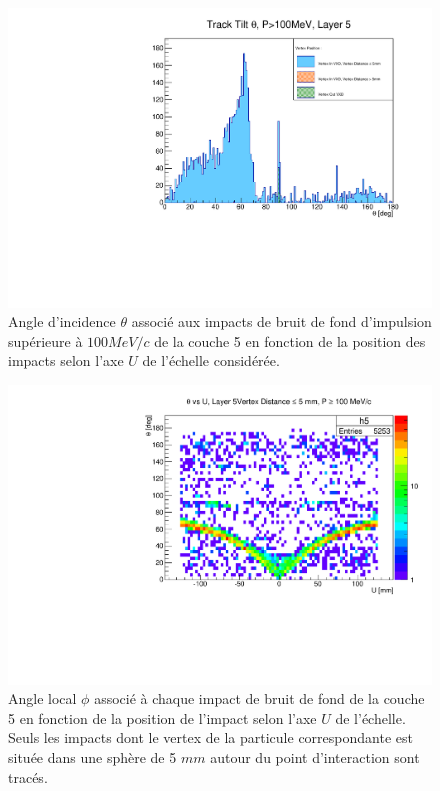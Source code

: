 \begin{appendices}
  \begin{figure}[!phtb]
    \centering
    \includegraphics[scale=0.58]{./figures/Track_Tilts_Beamstrahlung/beamstrahlung_Theta/Track_Tilts_Theta_P_sup_100MeV_Layer5.pdf}
    \caption{Angle d'incidence $\theta$ associ\'e aux impacts de bruit de fond d'impulsion sup\'erieure \`a $100 MeV/c$ de la couche 5 en fonction de la position des impacts selon l'axe $U$ de l'\'echelle consid\'er\'ee.}
    \label{fig:theta_Layer5_pT_sup_100MeV}
  \end{figure}
  
  \begin{figure}[!htb]
    \centering
    \includegraphics[scale=0.58]{./figures/Track_Tilts_Beamstrahlung/beamstrahlung_Theta/Track_Tilts_Theta_vs_U_P_sup_100MeV_vertex_inf_5mm_Layer5.pdf}
    \caption{Angle local $\phi$ associ\'e \`a chaque impact de bruit de fond de la couche 5 en fonction de la position de l'impact selon l'axe $U$ de l'\'echelle. Seuls les impacts dont le vertex de la particule correspondante est situ\'ee dans une sph\`ere de 5 $mm$ autour du point d'interaction sont trac\'es.}
    \label{fig:theta_Layer5_vs_U_P_sup_100MeV_vertex_inf_5mm}
  \end{figure}
  

\end{appendices}
